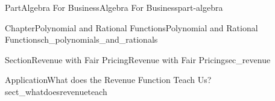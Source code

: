 \documentclass[oneside,10pt,]{tufte-book}
\numberwithin{equation}{chapter}
\begin{document}
\begin{partptx}{Part}{Algebra For Business}{}{Algebra For Business}{}{}{part-algebra}
\begin{chapterptx}{Chapter}{Polynomial and Rational Functions}{}{Polynomial and Rational Functions}{}{}{ch_polynomials_and_rationals}
\begin{sectionptx}{Section}{Revenue with Fair Pricing}{}{Revenue with Fair Pricing}{}{}{sec_revenue}
\begin{insight}{Application}{What does the Revenue Function Teach Us?}{sect_whatdoesrevenueteach}
\begin{image}{0}{1}{0}{}
{\begin{tikzpicture}[xscale=\xscale,yscale=\yscale]
	
\end{tikzpicture}
%
\quad
%
}
\end{image}
\end{insight}
\end{sectionptx}
\end{chapterptx}
\end{partptx}
\end{document}
